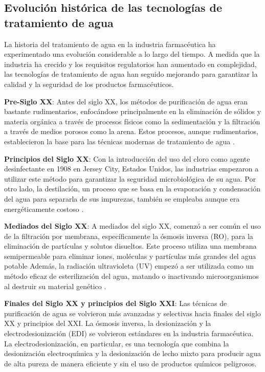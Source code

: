 \subsection{Evolución histórica de las tecnologías de tratamiento de agua}

La historia del tratamiento de agua en la industria farmacéutica ha experimentado una evolución considerable a lo largo del tiempo. A medida que la industria ha crecido y los requisitos regulatorios han aumentado en complejidad, las tecnologías de tratamiento de agua han seguido mejorando para garantizar la calidad y la seguridad de los productos farmacéuticos.

\textbf{Pre-Siglo XX}: Antes del siglo XX, los métodos de purificación de agua eran bastante rudimentarios, 
enfocándose principalmente en la eliminación de sólidos y materia orgánica a través de procesos físicos como 
la sedimentación y la filtración a través de medios porosos como la arena. Estos procesos, aunque rudimentarios, 
establecieron la base para las técnicas modernas de tratamiento de agua \cite{higieneambientalHistoriaTratamientoAgua2018}.

\textbf{Principios del Siglo XX}: Con la introducción del uso del cloro como agente desinfectante en 1908 en Jersey City, 
Estados Unidos, las industrias empezaron a utilizar este método para garantizar la seguridad microbiológica de su agua. 
Por otro lado, la destilación, un proceso que se basa en la evaporación y condensación del agua para separarla de sus
 impurezas, también se empleaba aunque era energéticamente costoso \cite{higieneambientalHistoriaTratamientoAgua2018}.

\textbf{Mediados del Siglo XX}: A mediados del siglo XX, comenzó a ser común el uso de la filtración por membrana, 
específicamente la ósmosis inversa (RO), para la eliminación de partículas y solutos disueltos. Este proceso utiliza 
una membrana semipermeable para eliminar iones, moléculas y partículas más grandes del agua potable Además, 
la radiación ultravioleta (UV) empezó a ser utilizada como un método eficaz de esterilización del agua, 
matando o inactivando microorganismos al destruir su material genético \cite{higieneambientalHistoriaTratamientoAgua2018}.

\textbf{Finales del Siglo XX y principios del Siglo XXI}: Las técnicas de purificación de agua se volvieron más avanzadas y selectivas hacia 
finales del siglo XX y principios del XXI. La ósmosis inversa, la desionización y la electrodesionización (EDI) 
se volvieron estándares en la industria farmacéutica. La electrodesionización, en particular, es una tecnología 
que combina la desionización electroquímica y la desionización de lecho mixto para producir agua de alta pureza de 
manera eficiente y sin el uso de productos químicos peligrosos.

